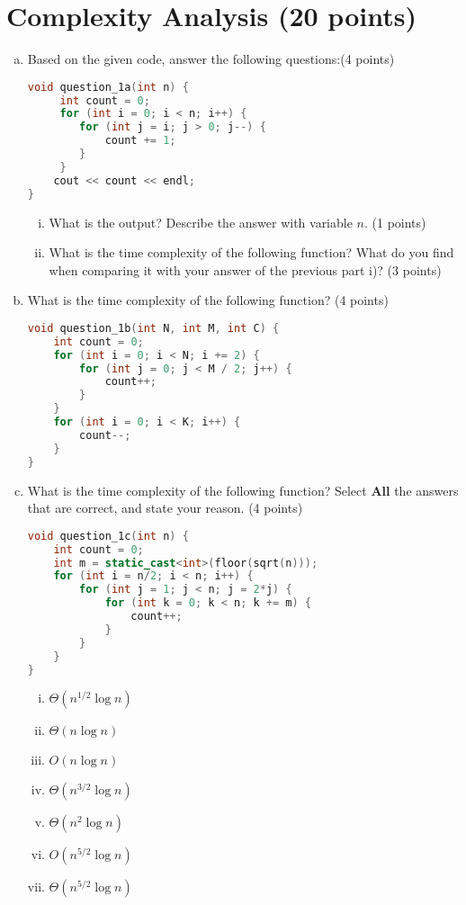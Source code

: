 \documentclass[11pt]{exam}
\begin{document}
\section{Complexity Analysis (20 points)}

\begin{enumerate}[(a)]

\item Based on the given code, answer the following questions:(4 points)
\begin{lstlisting}[language=c++]
void question_1a(int n) {
	 int count = 0;
	 for (int i = 0; i < n; i++) {
	 	for (int j = i; j > 0; j--) {
	 		count += 1;
	 	}
	 }
	cout << count << endl;
}
\end{lstlisting}
\begin{enumerate}[i)]
\item What is the output? Describe the answer with variable $n$. (1 points)
\item What is the time complexity of the following function? What do you find when comparing it with your answer of the previous part i)? (3 points)
\end{enumerate}

\begin{solution}
\end{solution}

\item What is the time complexity of the following function? (4 points)
\begin{lstlisting}[language=c++]
void question_1b(int N, int M, int C) {
	int count = 0;
	for (int i = 0; i < N; i += 2) {
		for (int j = 0; j < M / 2; j++) {
			count++;
		}
	}
	for (int i = 0; i < K; i++) {
		count--;
	}
}
\end{lstlisting}

\begin{solution}
\end{solution}

\item What is the time complexity of the following function? Select \textbf{All} the answers that are correct, and state your reason.  (4 points)
\begin{lstlisting}[language=c++]
void question_1c(int n) {
	int count = 0;
	int m = static_cast<int>(floor(sqrt(n)));
	for (int i = n/2; i < n; i++) {
		for (int j = 1; j < n; j = 2*j) {
			for (int k = 0; k < n; k += m) {
				count++;
			}
		}
	}
}
\end{lstlisting}
\begin{enumerate}[i)]
\item $\Theta(n^{1/2}\log n)$
\item $\Theta(n \log n)$
\item $O(n \log n)$
\item $\Theta(n^{3/2}\log n)$
\item $\Theta(n^2\log n)$
\item $O(n^{5/2}\log n)$
\item $\Theta(n^{5/2}\log n)$
\end{enumerate}
\begin{solution}
\end{solution}


\end{enumerate}
\end{document}
